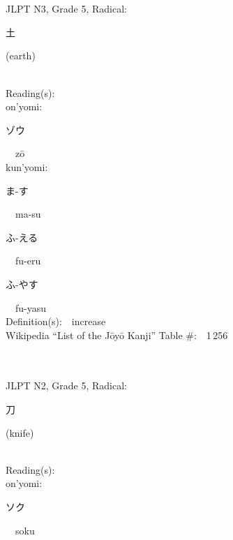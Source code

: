 \begin{multicols}{2}
\ \ \\
{\fontsize{34pt}{40pt}  }\ \ \\  %
{JLPT N3, Grade 5, Radical:\ \ {\begin{CJK}{UTF8}{min} 土 \end{CJK}} (earth) } \\
Reading(s):\ \ \\
{\hspace*{1em}}on'yomi:\ \ \\
{\hspace*{2em}}{\begin{CJK}{UTF8}{min} ゾウ \end{CJK}}\ \ z\=o\ \ \\
{\hspace*{1em}}kun'yomi:\ \ \\
{\hspace*{2em}}{\begin{CJK}{UTF8}{min} ま-す \end{CJK}}\ \ ma-su\ \ \\
{\hspace*{2em}}{\begin{CJK}{UTF8}{min} ふ-える \end{CJK}}\ \ fu-eru\ \ \\
{\hspace*{2em}}{\begin{CJK}{UTF8}{min} ふ-やす \end{CJK}}\ \ fu-yasu\ \ \\
Definition(s):\ \ increase \\
Wikipedia ``List of the J\=oy\=o Kanji'' Table \#:\ \ 1\,256 \\
\ \ \\
{\fontsize{34pt}{40pt}  }\ \ \\  %
{JLPT N2, Grade 5, Radical:\ \ {\begin{CJK}{UTF8}{min} 刀 \end{CJK}} (knife) } \\
Reading(s):\ \ \\
{\hspace*{1em}}on'yomi:\ \ \\
{\hspace*{2em}}{\begin{CJK}{UTF8}{min} ソク \end{CJK}}\ \ soku\ \ \\

\end{multicols}
